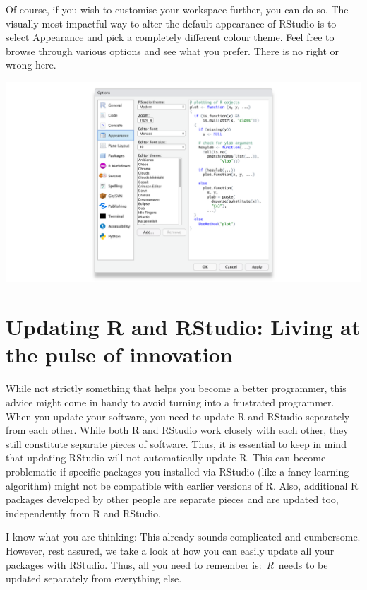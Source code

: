 \documentclass[
]{book}
\begin{document}
Of course, if you wish to customise your workspace further, you can do so. The visually most impactful way to alter the default appearance of RStudio is to select Appearance and pick a completely different colour theme. Feel free to browse through various options and see what you prefer. There is no right or wrong here.

\includegraphics{images/chapter_03_img/rstudio_preferences/02_rstudio_preferences_appearance.png}

\hypertarget{updating-r-and-rstudio}{%
\section{Updating R and RStudio: Living at the pulse of innovation}\label{updating-r-and-rstudio}}

While not strictly something that helps you become a better programmer, this advice might come in handy to avoid turning into a frustrated programmer. When you update your software, you need to update R and RStudio separately from each other. While both R and RStudio work closely with each other, they still constitute separate pieces of software. Thus, it is essential to keep in mind that updating RStudio will not automatically update R. This can become problematic if specific packages you installed via RStudio (like a fancy learning algorithm) might not be compatible with earlier versions of R. Also, additional R packages developed by other people are separate pieces and are updated too, independently from R and RStudio.

I know what you are thinking: This already sounds complicated and cumbersome. However, rest assured, we take a look at how you can easily update all your packages with RStudio. Thus, all you need to remember is:~\emph{R}~needs to be updated separately from everything else.
\end{document}
